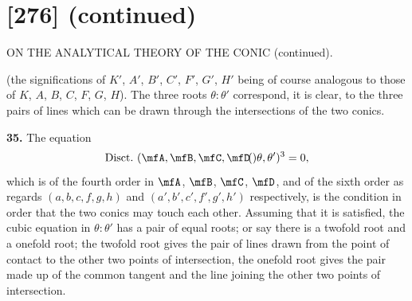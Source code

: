 \documentclass[11pt,a4paper]{book}
\providecommand{\qform}[1]{(#1)}
\begin{document}
\newpage
\section*{[276] (continued)}
\begin{center}
{\large ON THE ANALYTICAL THEORY OF THE CONIC (continued).}
\end{center}

(the significations of $K'$, $A'$, $B'$, $C'$, $F'$, $G'$, $H'$ being of course analogous to those of $K$, $A$, $B$, $C$, $F$, $G$, $H$). The three roots $\theta : \theta'$ correspond, it is clear, to the three pairs of lines which can be drawn through the intersections of the two conics.

\textbf{35.} The equation
\[
\text{Disct.}\ (\mfA, \mfB, \mfC, \mfD \!\qform{}{\theta, \theta'})^{3} = 0,
\]
which is of the fourth order in $\mfA$, $\mfB$, $\mfC$, $\mfD$, and of the sixth order as regards $(a, b, c, f, g, h)$ and $(a', b', c', f', g', h')$ respectively, is the condition in order that the two conics may touch each other. Assuming that it is satisfied, the cubic equation in $\theta : \theta'$ has a pair of equal roots; or say there is a twofold root and a onefold root; the twofold root gives the pair of lines drawn from the point of contact to the other two points of intersection, the onefold root gives the pair made up of the common tangent and the line joining the other two points of intersection.
\end{document}
